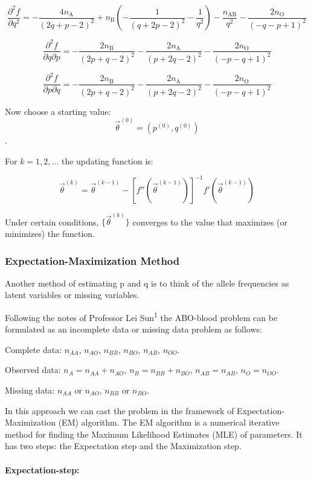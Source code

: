 \documentclass[]{article}
\let\oldparagraph\paragraph
\renewcommand{\paragraph}[1]{\oldparagraph{#1}\mbox{}}
\begin{document}
\[ \frac{\partial^2 f}{\partial q^2} = -\dfrac{4n_\text{A}}{\left(2q+p-2\right)^2}+n_\text{B}\left(-\dfrac{1}{\left(q+2p-2\right)^2}-\dfrac{1}{q^2}\right)-\dfrac{n_\text{AB}}{q^2}-\dfrac{2n_\text{O}}{\left(-q-p+1\right)^2}
\]

\[\frac{\partial^2 f}{\partial q \partial p } = -\dfrac{2n_\text{B}}{\left(2p+q-2\right)^2}-\dfrac{2n_\text{A}}{\left(p+2q-2\right)^2}-\dfrac{2n_\text{O}}{\left(-p-q+1\right)^2}
\]

\[\frac{\partial^2 f}{\partial p \partial q } =-\dfrac{2n_\text{B}}{\left(2p+q-2\right)^2}-\dfrac{2n_\text{A}}{\left(p+2q-2\right)^2}-\dfrac{2n_\text{O}}{\left(-p-q+1\right)^2}
\]

Now choose a starting value:
\[\vec \theta ^{(0)} = (p^{(0)}, q^{(0)})\].

For \(k=1,2,...\) the updating function is:

\[\vec \theta^{(k)} = \vec \theta^{(k-1)} 
- [f''(\vec \theta^{(k-1)})]^{-1} f'(\vec \theta^{(k-1)})\]

Under certain conditions, \(\{\vec \theta^{(k)}\}\) converges to the
value that maximizes (or minimizes) the function.

\subsubsection{Expectation-Maximization
Method}\label{expectation-maximization-method}

Another method of estimating p and q is to think of the allele
frequencies as latent variables or missing variables.

Following the notes of Professor Lei Sun\textsuperscript{1} the
ABO-blood problem can be formulated as an incomplete data or missing
data problem as follows:

Complete data: \(n_{AA}\), \(n_{AO}\), \(n_{BB}\), \(n_{BO}\),
\(n_{AB}\), \(n_{OO}\).

Observed data: \(n_A=n_{AA}+n_{AO}\), \(n_B=n_{BB}+n_{BO}\),
\(n_{AB}=n_{AB}\), \(n_{O}=n_{OO}\).

Missing data: \(n_{AA}\) or \(n_{AO}\), \(n_{BB}\) or \(n_{BO}\).

In this approach we can cast the problem in the framework of
Expectation-Maximization (EM) algorithm. The EM algorithm is a numerical
iterative method for finding the Maximum Likelihood Estimates (MLE) of
parameters. It has two steps: the Expectation step and the Maximization
step.

\paragraph{Expectation-step:}\label{expectation-step}
\end{document}

